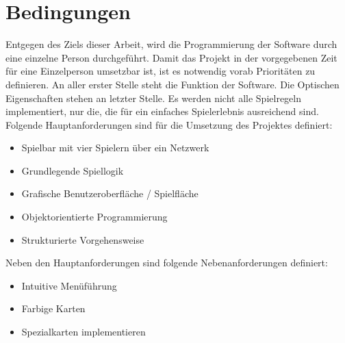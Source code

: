 
\chapter{Bedingungen}
\label{ch:bedingungen}
Entgegen des Ziels dieser Arbeit, wird die Programmierung der Software durch eine einzelne Person durchgeführt. Damit das Projekt in der vorgegebenen Zeit für eine Einzelperson umsetzbar ist, ist es notwendig vorab Prioritäten zu definieren. An aller erster Stelle steht die Funktion der Software. Die Optischen Eigenschaften stehen an letzter Stelle. Es werden nicht alle Spielregeln implementiert, nur die, die für ein einfaches Spielerlebnis ausreichend sind.\\
Folgende Hauptanforderungen sind für die Umsetzung des Projektes definiert:
\begin{itemize}
	\item Spielbar mit vier Spielern über ein Netzwerk 
	\item Grundlegende Spiellogik
	\item Grafische Benutzeroberfläche / Spielfläche
	\item Objektorientierte Programmierung
	\item Strukturierte Vorgehensweise
\end{itemize}
Neben den Hauptanforderungen sind folgende Nebenanforderungen definiert:
\begin{itemize}
	\item Intuitive Menüführung
	\item Farbige Karten
	\item Spezialkarten implementieren
\end{itemize}